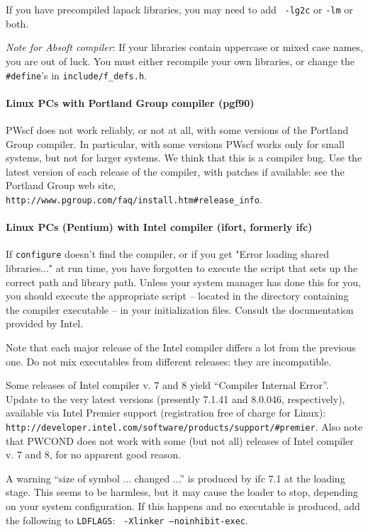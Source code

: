 \documentclass[12pt]{article}
\begin{document}
If you have precompiled lapack libraries, you may need to add {\tt
-lg2c} or {\tt -lm} or both.

{\em Note for Absoft compiler}: 
If your libraries contain uppercase or mixed case names, you are out of
luck. You must either recompile your own libraries, or change the {\tt
\#define}'s in {\tt include/f\_defs.h}.

\paragraph{Linux PCs with Portland Group compiler (pgf90)}

PWscf does not work reliably, or not at all, with some versions of the
Portland Group compiler. In particular, with some versions PWscf works 
only for small systems, but not for larger systems. We think that this
is a compiler bug. Use the latest version of each release of the compiler, 
with patches if available: see the Portland Group web site, 
{\tt http://www.pgroup.com/faq/install.htm\#release\_info}.

\paragraph{Linux PCs (Pentium) with Intel compiler (ifort, formerly ifc)}

If {\tt configure} doesn't find the compiler, or if you get 
"Error loading shared libraries..." at run time, you have 
forgotten to execute the script that sets up the correct path and 
library path. Unless your system manager has done this for you, you 
should execute the appropriate script -- located in the directory 
containing the compiler executable -- in your initialization files.
Consult the documentation provided by Intel. 

Note that each major release of the Intel compiler differs a lot from
the previous one. Do not mix executables from different releases: they
are incompatible.

Some releases of Intel compiler v. 7 and 8 yield ``Compiler Internal 
Error''. Update to the very latest versions (presently 7.1.41 and 8.0.046, 
respectively), available via Intel Premier support (registration free of 
charge for Linux): 
{\tt http://developer.intel.com/software/products/support/\#premier}.
Also note that PWCOND does not work with some (but not all)
releases of Intel compiler v. 7 and 8, for no apparent good reason.

A warning ``size of symbol ... changed ...'' is produced by ifc 7.1 at
the loading stage. This seems to be harmless, but it may cause the
loader to stop, depending on your system configuration.  If this happens
and no executable is produced, add the following to {\tt LDFLAGS}: {\tt
-Xlinker --noinhibit-exec}.
\end{document}
